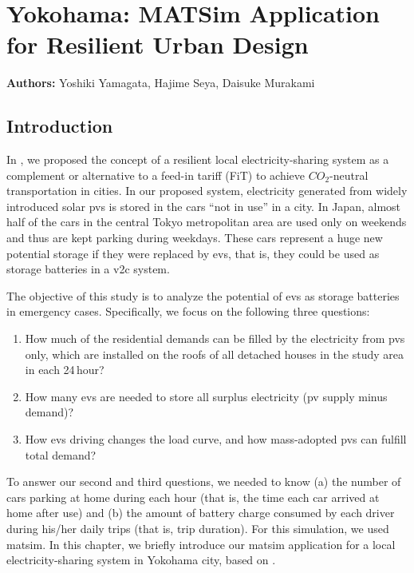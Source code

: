 \chapter{Yokohama: MATSim Application for Resilient Urban Design}
\label{ch:yokohama}
\hfill \textbf{Authors:} Yoshiki Yamagata, Hajime Seya, Daisuke Murakami

\section{Introduction}
In \citet[][]{YamagataSeya_ITSIET_2015}, we proposed the concept of a resilient local electricity-sharing system as a complement or alternative to a feed-in tariff (FiT) to achieve $CO_2$-neutral transportation in cities. In our proposed system, electricity generated from widely introduced solar \glspl{pv}
is stored in the cars ``not in use'' in a city. In Japan, almost half of the cars in the central Tokyo metropolitan area are used only on weekends and thus are kept parking during weekdays. These cars represent a huge new potential storage if they were replaced by \glspl{ev}, that is, they could be used as storage batteries in a \gls{v2c} system. 

The objective of this study is to analyze the potential of \glspl{ev} as storage batteries in emergency cases. Specifically, we focus on the following three questions: 
\begin{enumerate}\styleEnumerate
\item How much of the residential demands can be filled by the electricity from \glspl{pv} only, which are installed on the roofs of all detached houses in the study area in each 24\,hour? 
\item How many \glspl{ev} are needed to store all surplus electricity (\gls{pv} supply minus demand)?
\item How \glspl{ev} driving changes the load curve, and how mass-adopted \glspl{pv} can fulfill total demand? 
\end{enumerate}
To answer our second and third questions, we needed to know (a) the number of cars parking at home during each hour (that is, the time each car arrived at home after use) and (b) the amount of battery charge consumed by each driver during his/her daily trips (that is, trip duration). For this simulation, we used \gls{matsim}. In this chapter, we briefly introduce our \gls{matsim} application for a local electricity-sharing system in Yokohama city, based on \citet[][]{YamagataSeya_ApE_2013, YamagataEtAl_EnPro_2014, YamagataEtAl_ICAE_2015}.

